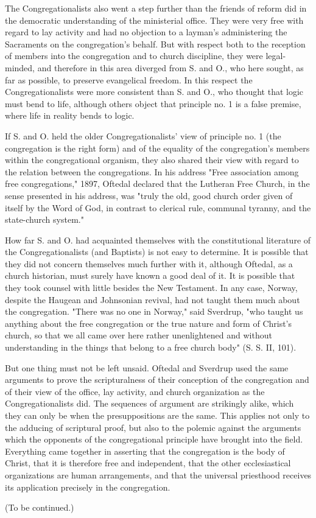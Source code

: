The Congregationalists also went a step further than the friends of reform did in the democratic understanding of the ministerial office. They were very free with regard to lay activity and had no objection to a layman’s administering the Sacraments on the congregation’s behalf. But with respect both to the reception of members into the congregation and to church discipline, they were legal-minded, and therefore in this area diverged from S. and O., who here sought, as far as possible, to preserve evangelical freedom. In this respect the Congregationalists were more consistent than S. and O., who thought that logic must bend to life, although others object that principle no. 1 is a false premise, where life in reality bends to logic.

If S. and O. held the older Congregationalists’ view of principle no. 1 (the congregation is the right form) and of the equality of the congregation’s members within the congregational organism, they also shared their view with regard to the relation between the congregations. In his address "Free association among free congregations," 1897, Oftedal declared that the Lutheran Free Church, in the sense presented in his address, was "truly the old, good church order given of itself by the Word of God, in contrast to clerical rule, communal tyranny, and the state-church system."

How far S. and O. had acquainted themselves with the constitutional literature of the Congregationalists (and Baptists) is not easy to determine. It is possible that they did not concern themselves much further with it, although Oftedal, as a church historian, must surely have known a good deal of it. It is possible that they took counsel with little besides the New Testament. In any case, Norway, despite the Haugean and Johnsonian revival, had not taught them much about the congregation. "There was no one in Norway," said Sverdrup, "who taught us anything about the free congregation or the true nature and form of Christ’s church, so that we all came over here rather unenlightened and without understanding in the things that belong to a free church body" (S. S. II, 101).

But one thing must not be left unsaid. Oftedal and Sverdrup used the same arguments to prove the scripturalness of their conception of the congregation and of their view of the office, lay activity, and church organization as the Congregationalists did. The sequences of argument are strikingly alike, which they can only be when the presuppositions are the same. This applies not only to the adducing of scriptural proof, but also to the polemic against the arguments which the opponents of the congregational principle have brought into the field. Everything came together in asserting that the congregation is the body of Christ, that it is therefore free and independent, that the other ecclesiastical organizations are human arrangements, and that the universal priesthood receives its application precisely in the congregation.

(To be continued.)